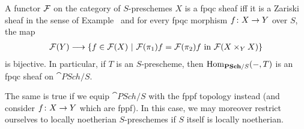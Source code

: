 \documentclass[a4paper,parskip=half,numbers=enddot, DIV=12]{scrreprt}
\begin{document}
\begin{prop}
	A functor $\mathcal{F}$ on the category of $S$-preschemes $X$ is a fpqc sheaf iff it is a Zariski sheaf in the sense of Example~ and for every fpqc morphism $f\colon X\morphism Y$ over $S$, the map
	\begin{align*}
		\Ff(Y)\morphism\left\{f\in\Ff(X)\st \Ff(\pi_1)f=\Ff(\pi_2)f\text{ in }\Ff(X\times_YX)\right\}
	\end{align*}
	is bijective. In particular, if $T$ is an $S$-prescheme, then $\Hom_{\cat{PSch}/S}(-,T)$ is an fpqc sheaf on $\cat{PSch}/S$.
	
	The same is true if we equip $\cat{PSch}/S$ with the fppf topology instead (and consider $f\colon X\morphism Y$ which are fppf). In this case, we may moreover restrict ourselves to locally noetherian $S$-preschemes if $S$ itself is locally noetherian.
\end{prop}
\end{document}
